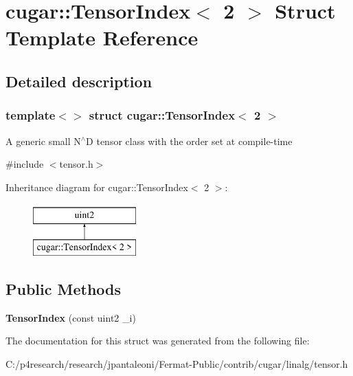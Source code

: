 \hypertarget{structcugar_1_1_tensor_index_3_012_01_4}{}\section{cugar\+:\+:Tensor\+Index$<$ 2 $>$ Struct Template Reference}
\label{structcugar_1_1_tensor_index_3_012_01_4}


\subsection{Detailed description}
\subsubsection*{template$<$$>$\newline
struct cugar\+::\+Tensor\+Index$<$ 2 $>$}

A generic small N$^\wedge$D tensor class with the order set at compile-\/time 

{\ttfamily \#include $<$tensor.\+h$>$}

Inheritance diagram for cugar\+:\+:Tensor\+Index$<$ 2 $>$\+:\begin{figure}[H]
\begin{center}
\leavevmode
\includegraphics[height=2.000000cm]{structcugar_1_1_tensor_index_3_012_01_4}
\end{center}
\end{figure}
\subsection*{Public Methods}
\begin{DoxyCompactItemize}
\item 
\mbox{\label{structcugar_1_1_tensor_index_3_012_01_4_a349ff801e5f5753ad6f8b88ba55a027c}} 
{\bfseries Tensor\+Index} (const uint2 \+\_\+i)
\end{DoxyCompactItemize}


The documentation for this struct was generated from the following file\+:\begin{DoxyCompactItemize}
\item 
C\+:/p4research/research/jpantaleoni/\+Fermat-\/\+Public/contrib/cugar/linalg/tensor.\+h\end{DoxyCompactItemize}
